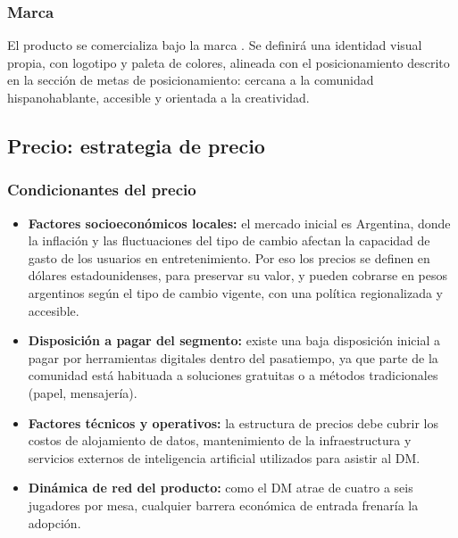 \subsubsection{Marca}
El producto se comercializa bajo la marca \nombreproyecto{}. Se definirá una identidad visual propia, con logotipo y paleta de colores, alineada con el posicionamiento descrito en la sección de metas de posicionamiento: cercana a la comunidad hispanohablante, accesible y orientada a la creatividad.

\subsection{Precio: estrategia de precio}

\subsubsection{Condicionantes del precio}
\begin{itemize}
  \item \textbf{Factores socioeconómicos locales:} el mercado inicial es Argentina, donde la inflación y las fluctuaciones del tipo de cambio afectan la capacidad de gasto de los usuarios en entretenimiento. Por eso los precios se definen en dólares estadounidenses, para preservar su valor, y pueden cobrarse en pesos argentinos según el tipo de cambio vigente, con una política regionalizada y accesible.
  \item \textbf{Disposición a pagar del segmento:} existe una baja disposición inicial a pagar por herramientas digitales dentro del pasatiempo, ya que parte de la comunidad está habituada a soluciones gratuitas o a métodos tradicionales (papel, mensajería).
  \item \textbf{Factores técnicos y operativos:} la estructura de precios debe cubrir los costos de alojamiento de datos, mantenimiento de la infraestructura y servicios externos de inteligencia artificial utilizados para asistir al DM.
  \item \textbf{Dinámica de red del producto:} como el DM atrae de cuatro a seis jugadores por mesa, cualquier barrera económica de entrada frenaría la adopción.
\end{itemize}

